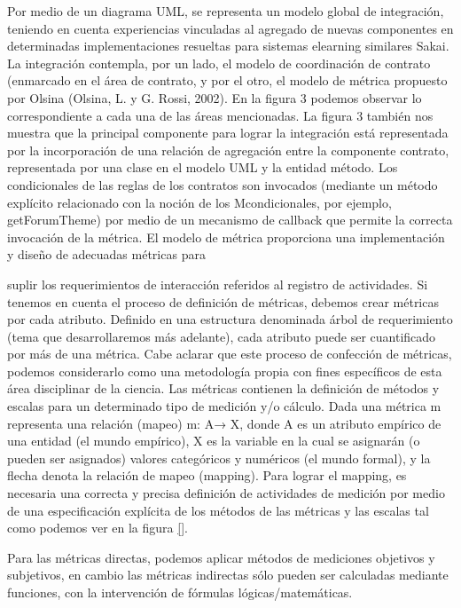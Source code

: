 \begin{itemize}
Por medio de un diagrama UML, se representa un modelo global de integración, teniendo en cuenta experiencias vinculadas al agregado de nuevas componentes en determinadas implementaciones resueltas para sistemas elearning similares Sakai. La integración contempla, por un lado, el modelo de coordinación de contrato (enmarcado en el área de contrato, y por el otro, el modelo de métrica propuesto por Olsina (Olsina, L. y G. Rossi, 2002). En la figura 3 podemos observar lo correspondiente a cada una de las áreas mencionadas. La figura 3 también nos muestra que la principal componente para lograr la integración está representada por la incorporación de una relación de agregación entre la componente contrato, representada por una clase en el modelo UML y la entidad método. Los condicionales de las reglas de los contratos son
invocados (mediante un método explícito relacionado con la noción de los
Mcondicionales, por ejemplo, getForumTheme) por medio de un mecanismo
de callback que permite la correcta invocación de la métrica. El modelo de
métrica proporciona una implementación y diseño de adecuadas métricas para

suplir los requerimientos de interacción referidos al registro de actividades. Si
tenemos en cuenta el proceso de definición de métricas, debemos crear métricas
por cada atributo. Definido en una estructura denominada árbol de requerimiento
(tema que desarrollaremos más adelante), cada atributo puede ser
cuantificado por más de una métrica.
Cabe aclarar que este proceso de confección de métricas, podemos considerarlo
como una metodología propia con fines específicos de esta área disciplinar
de la ciencia.
Las métricas contienen la definición de métodos y escalas para un determinado
tipo de medición y/o cálculo. Dada una métrica m representa una relación
(mapeo) m: A→ X, donde A es un atributo empírico de una entidad (el
mundo empírico), X es la variable en la cual se asignarán (o pueden ser asignados)
valores categóricos y numéricos (el mundo formal), y la flecha denota
la relación de mapeo (mapping). Para lograr el mapping, es necesaria una
correcta y precisa definición de actividades de medición por medio de una
especificación explícita de los métodos de las métricas y las escalas tal como
podemos ver en la figura \ref{}.

Para las métricas directas, podemos aplicar métodos de mediciones objetivos
y subjetivos, en cambio las métricas indirectas sólo pueden ser calculadas
mediante funciones, con la intervención de fórmulas lógicas/matemáticas.



\end{itemize}
